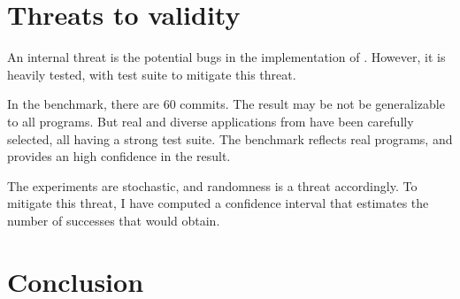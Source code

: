 \section{Threats to validity}
\label{sec:dci:threats}

An internal threat is the potential bugs in the implementation of \DCI.
However, it is heavily tested, with \junit test suite to mitigate this threat.

In the benchmark, there are 60 commits. 
The result may be not be generalizable to all programs. 
But real and diverse applications from \gh have been carefully selected, all having a strong test suite. 
The benchmark reflects real programs, and provides an high confidence in the result.

The experiments are stochastic, and randomness is a threat accordingly.
To mitigate this threat, I have computed a confidence interval that estimates the number of successes that \DCI would obtain.

\section{Conclusion}
\label{sec:dci:conclusion}